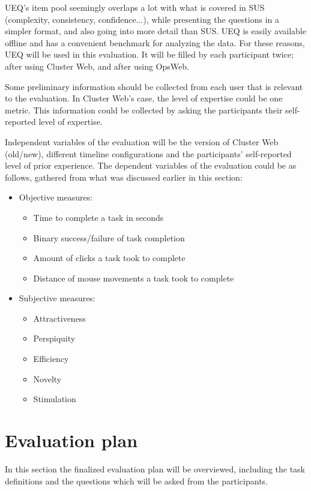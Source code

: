 UEQ's item pool seemingly overlaps a lot with what is covered in SUS (complexity, consistency, confidence...), while presenting the questions in a simpler format, and also going into more detail than SUS. UEQ is easily available offline and has a convenient benchmark for analyzing the data. For these reasons, UEQ will be used in this evaluation. It will be filled by each participant twice; after using Cluster Web, and after using OpsWeb.

Some preliminary information should be collected from each user that is relevant to the evaluation. In Cluster Web's case, the level of expertise could be one metric. This information could be collected by asking the participants their self-reported level of expertise.

Independent variables of the evaluation will be the version of Cluster Web (old/new), different timeline configurations and the participants' self-reported level of prior experience. The dependent variables of the evaluation could be as follows, gathered from what was discussed earlier in this section:

\begin{itemize}
\item Objective measures:
\begin{itemize}
\item Time to complete a task in seconds
\item Binary success/failure of task completion
\item Amount of clicks a task took to complete
\item Distance of mouse movements a task took to complete
\end{itemize}
\item Subjective measures:
\begin{itemize}
\item Attractiveness
\item Perspiquity
\item Efficiency
\item Novelty
\item Stimulation
\end{itemize}
\end{itemize}

\section{Evaluation plan} \label{evaluation_plan}
In this section the finalized evaluation plan will be overviewed, including the task definitions and the questions which will be asked from the participants.

